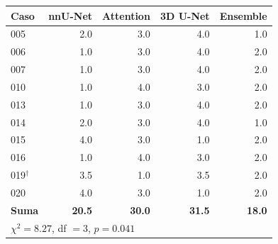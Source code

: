 \begin{tabular}{lrrrr}
\toprule
Caso & nnU-Net & Attention & 3D U-Net & Ensemble \\
\midrule
005 & 2.0 & 3.0 & 4.0 & 1.0 \\
006 & 1.0 & 3.0 & 4.0 & 2.0 \\
007 & 1.0 & 3.0 & 4.0 & 2.0 \\
010 & 1.0 & 4.0 & 3.0 & 2.0 \\
013 & 1.0 & 3.0 & 4.0 & 2.0 \\
014 & 2.0 & 3.0 & 4.0 & 1.0 \\
015 & 4.0 & 3.0 & 1.0 & 2.0 \\
016 & 1.0 & 4.0 & 3.0 & 2.0 \\
019$^\dagger$ & 3.5 & 1.0 & 3.5 & 2.0 \\
020 & 4.0 & 3.0 & 1.0 & 2.0 \\
\midrule
\bfseries Suma & \bfseries 20.5 & \bfseries 30.0 & \bfseries 31.5 & \bfseries 18.0 \\
\midrule
\multicolumn{5}{l}{$\chi^2 = 8.27$, df $= 3$, $p = 0.041$} \\
\bottomrule
\end{tabular}%